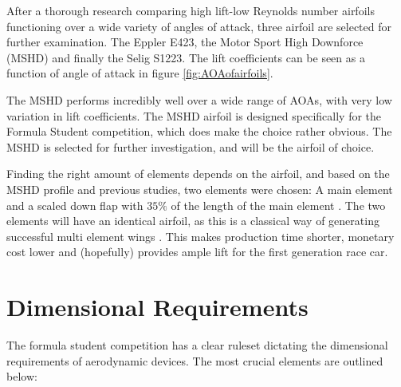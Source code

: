     After a thorough research comparing high lift-low Reynolds number airfoils functioning over a wide variety of angles of attack, three airfoil are selected for further examination. The Eppler E423, the Motor Sport High Downforce (MSHD) and finally the Selig S1223. The lift coefficients can be seen as a function of angle of attack in figure \ref{fig:AOAofairfoils}.

    The MSHD performs incredibly well over a wide range of AOAs, with very low variation in lift coefficients. The MSHD airfoil is designed specifically for the Formula Student competition, which does make the choice rather obvious. The MSHD is selected for further investigation, and will be the airfoil of choice.

    Finding the right amount of elements depends on the airfoil, and based on the MSHD profile and previous studies, two elements were chosen: A main element and a scaled down flap with $35\%$ of the length of the main element \cite{winginitialangle}. The two elements will have an identical airfoil, as this is a classical way of generating successful multi element wings \cite{sameairfoilgoodidea}. This makes production time shorter, monetary cost lower and (hopefully) provides ample lift for the first generation race car.

  \section{Dimensional Requirements}

    The formula student competition has a clear ruleset dictating the dimensional requirements of aerodynamic devices. The most crucial elements are outlined below:


